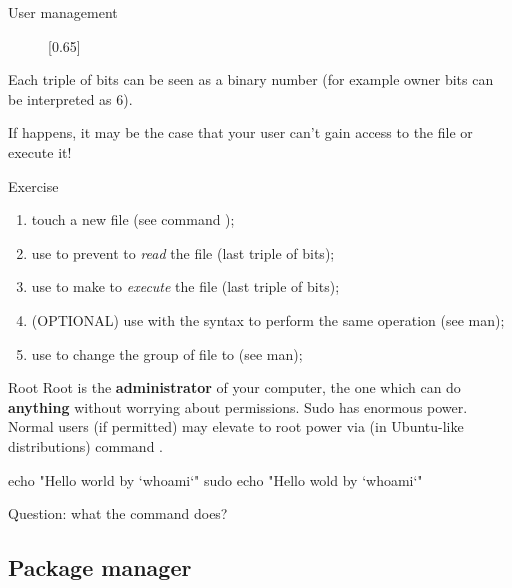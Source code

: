 \begin{frame}[fragile]{User management}
{\fbox{\theverbbox[t]}

\begin{figure}
	\centering
	[0.65]
\end{figure}

Each triple of bits can be seen as a binary number (for example owner bits can be interpreted as 6).

\begin{note}
If  happens, it may be the case that your user can't gain access to the file or execute it!
\end{note}

}

\end{frame}

\begin{frame}{Exercise}
	\begin{enumerate}
		\item touch a new file  (see command );
		\item use  to prevent  to \textit{read} the file (last triple of bits);
		\item use  to make  to \textit{execute} the file (last triple of bits);
		\item (OPTIONAL) use  with the syntax  to perform the same operation (see  man);
		\item use  to change the group of  file to  (see  man);
	\end{enumerate}
\end{frame}

\begin{frame}[fragile]{Root}
	Root is the \textbf{administrator} of your computer, the one which can do \textbf{anything} without worrying about permissions. Sudo has enormous power. Normal users (if permitted) may elevate to root power via (in Ubuntu-like distributions) command .
	
\begin{verbbox}
echo "Hello world by `whoami`"
sudo echo "Hello wold by `whoami`"
\end{verbbox}
\fbox{\theverbbox[t]}

Question: what the command  does?
	
\end{frame}

\subsection{Package manager}

